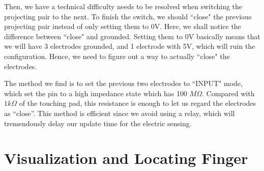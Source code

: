 \documentclass[reprint,amsmath, amsfonts, amssymb, aps, letterpaper]{revtex4-1}
\begin{document}
Then, we have a technical difficulty needs to be resolved when switching the projecting pair to the next. To finish the switch, we should ``close" the previous projecting pair instead of only setting them to 0V. Here, we shall notice the difference between ``close" and grounded. Setting them to 0V basically means that we will have 3 electrodes grounded, and 1 electrode with 5V, which will ruin the configuration. Hence, we need to figure out a way to actually ``close" the electrodes.

The method we find is to set the previous two electrodes to ``INPUT" mode, which set the pin to a high impedance state which has 100 $\si{M\Omega}$. Compared with $1\si{k\Omega}$ of the touching pad, this resistance is enough to let us regard the electrodes as ``close''. This method is efficient since we avoid using a relay, which will tremendously delay our update time for the electric sensing. 


\section{Visualization and Locating Finger}
\end{document}
